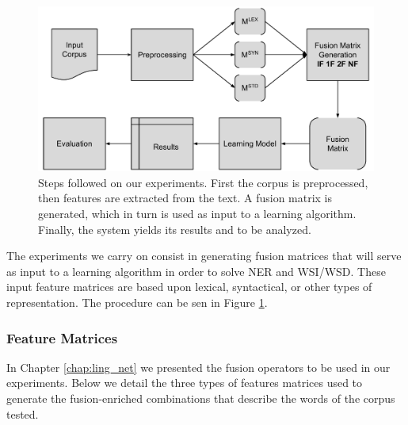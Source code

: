 


\begin{figure}[t]
\centering
\caption{Steps followed on our experiments. First the corpus is preprocessed, then features are extracted from the text. A fusion matrix is generated, which in turn is used as input to a learning algorithm. Finally, the system yields its results and to be analyzed.}
\includegraphics[width=0.85\linewidth]{images/Chapitre6/diag_metodo.pdf}

\label{fig:diagmetodo}
\end{figure}

The experiments we carry on consist in generating fusion matrices that will serve as input to a learning algorithm in order to solve NER and WSI/WSD. These input feature matrices are based upon lexical, syntactical, or other types of representation. The procedure can be sen in Figure \ref{fig:diagmetodo}.

\subsubsection{Feature Matrices}
In  Chapter \ref{chap:ling_net} we presented the fusion operators to be used in our experiments. Below we detail the three types of features matrices used to generate the fusion-enriched combinations that describe the words of the corpus tested.
